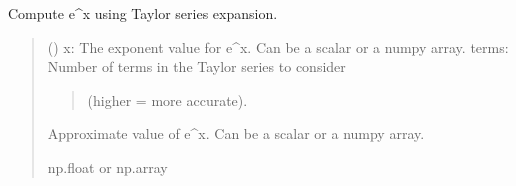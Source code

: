 \documentclass[letterpaper,10pt,english]{sphinxmanual}
\begin{document}
\begin{fulllineitems}
\begin{sphinxVerbatim}[commandchars=\\\{\}]
\PYG{p}{[}    \PYG{p}{]}
\end{sphinxVerbatim}

\end{fulllineitems}


\begin{fulllineitems}
\label{\detokenize{index:ascefunctions.taylors_series.trig_functions.exp}}
\pysigstartsignatures
\pysiglinewithargsret
{}
{\sphinxparamcomma {}}
{}
\pysigstopsignatures
\sphinxAtStartPar
Compute e\textasciicircum{}x using Taylor series expansion.
\begin{quote}\begin{description}
\sphinxAtStartPar
{} () \textendash{} 
\sphinxAtStartPar
x: The exponent value for e\textasciicircum{}x. Can be a scalar or a numpy array.
terms: Number of terms in the Taylor series to consider
\begin{quote}

\sphinxAtStartPar
(higher = more accurate).
\end{quote}


\sphinxAtStartPar
Approximate value of e\textasciicircum{}x. Can be a scalar or a numpy array.

\sphinxAtStartPar
np.float or np.array

\end{description}\end{quote}

\end{fulllineitems}
\end{document}

